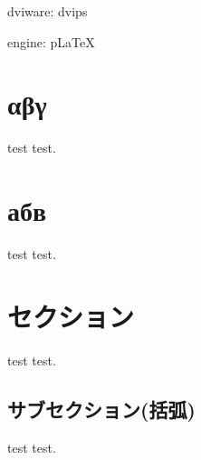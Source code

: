 \documentclass[autodetect-engine]{jsarticle}
\newif\ifuptexmode
\begin{document}
\parindent0mm

dviware: dvips

\ifuptexmode
engine: upLaTeX
\typeout{### engine: upLaTeX ###}
\else
engine: pLaTeX
\fi

\section{αβγ}
test test.

\section{абв}
test test.

\section{セクション}
test test.
\subsection{サブセクション(括弧)}
test test.

\ifuptexmode

\section{以下は、upLaTeXのみ}
\subsection{いわゆる『JIS2004』: ♡〠☎☃♨①❷ⅳⅤⓐ㋑}
便利な記号がいっぱい。

\subsection{Extension B (BMP外)の文字: 𠘨𤴔𦥑𧾷𩙿など}
𠘨𤴔𦥑𧾷𩙿

\fi
\end{document}
